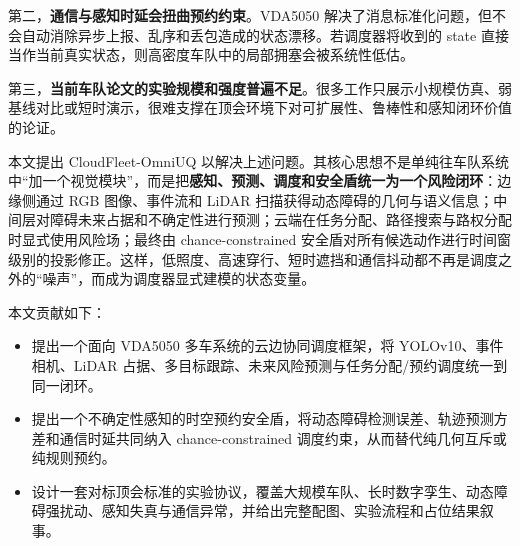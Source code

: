 \documentclass[UTF8,twocolumn,10pt]{ctexart}
\newcommand{\method}{CloudFleet-OmniUQ}
\begin{document}
第二，\textbf{通信与感知时延会扭曲预约约束}。VDA5050 解决了消息标准化问题，但不会自动消除异步上报、乱序和丢包造成的状态漂移。若调度器将收到的 state 直接当作当前真实状态，则高密度车队中的局部拥塞会被系统性低估。

第三，\textbf{当前车队论文的实验规模和强度普遍不足}。很多工作只展示小规模仿真、弱基线对比或短时演示，很难支撑在顶会环境下对可扩展性、鲁棒性和感知闭环价值的论证。

本文提出 \method{} 以解决上述问题。其核心思想不是单纯往车队系统中“加一个视觉模块”，而是把\textbf{感知、预测、调度和安全盾统一为一个风险闭环}：边缘侧通过 RGB 图像、事件流和 LiDAR 扫描获得动态障碍的几何与语义信息；中间层对障碍未来占据和不确定性进行预测；云端在任务分配、路径搜索与路权分配时显式使用风险场；最终由 chance-constrained 安全盾对所有候选动作进行时间窗级别的投影修正。这样，低照度、高速穿行、短时遮挡和通信抖动都不再是调度之外的“噪声”，而成为调度器显式建模的状态变量。

本文贡献如下：
\begin{itemize}
  \item 提出一个面向 VDA5050 多车系统的云边协同调度框架，将 YOLOv10、事件相机、LiDAR 占据、多目标跟踪、未来风险预测与任务分配/预约调度统一到同一闭环。
  \item 提出一个不确定性感知的时空预约安全盾，将动态障碍检测误差、轨迹预测方差和通信时延共同纳入 chance-constrained 调度约束，从而替代纯几何互斥或纯规则预约。
  \item 设计一套对标顶会标准的实验协议，覆盖大规模车队、长时数字孪生、动态障碍强扰动、感知失真与通信异常，并给出完整配图、实验流程和占位结果叙事。
\end{itemize}
\end{document}
